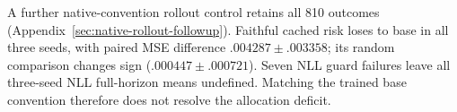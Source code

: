 A further native-convention rollout control retains all 810 outcomes (Appendix~\ref{sec:native-rollout-followup}). Faithful cached risk loses to base in all three seeds, with paired MSE difference $.004287\pm.003358$; its random comparison changes sign ($.000447\pm.000721$). Seven NLL guard failures leave all three-seed NLL full-horizon means undefined. Matching the trained base convention therefore does not resolve the allocation deficit.
